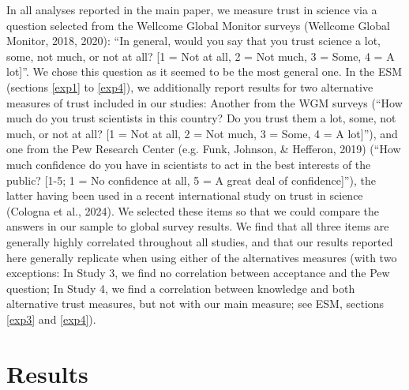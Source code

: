 \documentclass[
  doc,floatsintext]{apa6}
\begin{document}
In all analyses reported in the main paper, we measure trust in science via a question selected from the Wellcome Global Monitor surveys (Wellcome Global Monitor, 2018, 2020): ``In general, would you say that you trust science a lot, some, not much, or not at all? {[}1 = Not at all, 2 = Not much, 3 = Some, 4 = A lot{]}''. We chose this question as it seemed to be the most general one. In the ESM (sections \ref{exp1} to \ref{exp4}), we additionally report results for two alternative measures of trust included in our studies: Another from the WGM surveys (``How much do you trust scientists in this country? Do you trust them a lot, some, not much, or not at all? {[}1 = Not at all, 2 = Not much, 3 = Some, 4 = A lot{]}''), and one from the Pew Research Center (e.g. Funk, Johnson, \& Hefferon, 2019) (``How much confidence do you have in scientists to act in the best interests of the public? {[}1-5; 1 = No confidence at all, 5 = A great deal of confidence{]}''), the latter having been used in a recent international study on trust in science (Cologna et al., 2024). We selected these items so that we could compare the answers in our sample to global survey results. We find that all three items are generally highly correlated throughout all studies, and that our results reported here generally replicate when using either of the alternatives measures (with two exceptions: In Study 3, we find no correlation between acceptance and the Pew question; In Study 4, we find a correlation between knowledge and both alternative trust measures, but not with our main measure; see ESM, sections \ref{exp3} and \ref{exp4}).

\section{Results}\label{results}
\end{document}
